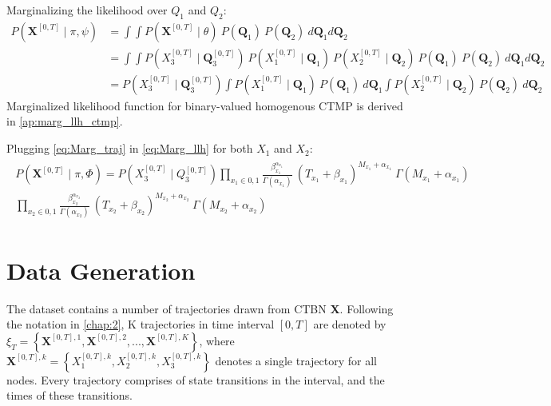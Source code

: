 Marginalizing the likelihood over $ Q_{1} $ and $ Q_{2} $:
\begin{align}
P(\textbf{X}^{[0,T]} \mid \pi, \psi ) & = 	\int \int P(\textbf{X}^{[0,T]} \mid \theta ) \ P(\textbf{Q}_{1}) \ P(\textbf{Q}_{2}) \ d\textbf{Q}_{1}d\textbf{Q}_{2} \nonumber\\ 
& = \int \int P(X_{3}^{[0, T]}\mid \textbf{Q}_{3}^{[0, T]}) \ P(X_{1}^{[0, T]}\mid \textbf{Q}_{1}) \ P(X_{2}^{[0, T]}\mid \textbf{Q}_{2}) \ P(\textbf{Q}_{1}) \ P(\textbf{Q}_{2})\ d\textbf{Q}_{1}d\textbf{Q}_{2} \nonumber\\ 
& = P(X_{3}^{[0, T]}\mid \textbf{Q}_{3}^{[0, T]}) \int  P(X_{1}^{[0, T]}\mid \textbf{Q}_{1}) \ P(\textbf{Q}_{1}) \ d\textbf{Q}_{1} \int P(X_{2}^{[0, T]}\mid \textbf{Q}_{2})\ P(\textbf{Q}_{2})\ d\textbf{Q}_{2}
\label{eq:Marg_llh}
\end{align}
Marginalized likelihood function for binary-valued homogenous CTMP is derived in \autoref{ap:marg_llh_ctmp}.

Plugging \autoref{eq:Marg_traj} in \autoref{eq:Marg_llh} for both $ X_{1} $ and $ X_{2} $:
\begin{align}
\begin{split}
P(\textbf{X}^{[0,T]} \mid \pi, \Phi ) = P(X_{3}^{[0, T]}\mid Q_{3}^{[0, T]}) \prod_{x_{1}\in{0,1}} \frac{\beta_{x_{1}}^{\alpha_{x_{1}}}}{\Gamma(\alpha_{x_{1}})} \ (T_{x_{1}}+\beta_{x_{1}})^{M_{x_{1}} + \alpha_{x_{1}}}\ \Gamma(M_{x_{1}} + \alpha_{x_{1}})  \\  \prod_{x_{2}\in{0,1}} \frac{\beta_{x_{2}}^{\alpha_{x_{2}}}}{\Gamma(\alpha_{x_{2}})} \ (T_{x_{2}}+\beta_{x_{2}})^{M_{x_{2}} + \alpha_{x_{2}}}\ \Gamma(M_{x_{2}} + \alpha_{x_{2}})
\label{eq:Marg_llh_final}
\end{split}
\end{align}

\section{Data Generation}
The dataset contains a number of trajectories drawn from CTBN \textbf{X}. Following the notation in \cref{chap:2}, K trajectories in time interval $ [0, T] $ are denoted by $ \xi_T = \left\lbrace \textbf{X}^{[0,T], 1}, \textbf{X}^{[0,T], 2}, ..., \textbf{X}^{[0,T], K} \right\rbrace  $, where $ \textbf{X}^{[0,T],k} = \left\lbrace X_1^{[0,T],k} , X_2^{[0,T],k}, X_3^{[0,T],k}\right\rbrace $ denotes a single trajectory for all nodes. Every trajectory comprises of state transitions in the interval, and the times of these transitions. 


